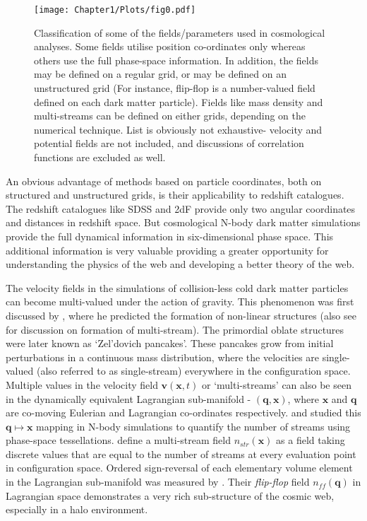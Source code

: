 \begin{figure*}
\begin{minipage}[t]{0.99\linewidth}
 \centering\texttt{[image: Chapter1/Plots/fig0.pdf]} 
\end{minipage}\hfill
{}
\caption{Classification of some of the fields/parameters used in cosmological analyses. Some fields utilise position co-ordinates only whereas others use the full phase-space information. In addition, the fields may be defined on a regular grid, or may be defined on an unstructured grid (For instance, flip-flop is a number-valued field defined on each dark matter particle). Fields like mass density and multi-streams can be defined on either grids, depending on the numerical technique. List is obviously not exhaustive- velocity and potential fields are not included, and discussions of correlation functions are excluded as well.}
\label{fig:cosmicfields}
\end{figure*}


An obvious advantage of methods based on particle coordinates, both on structured and unstructured grids, is their applicability to redshift catalogues. The redshift catalogues like SDSS and 2dF provide only two angular coordinates and distances in redshift space. But cosmological N-body dark matter simulations provide the full dynamical information in six-dimensional phase space. This additional information is very valuable providing a greater opportunity for understanding the physics of the web and developing a better theory of the web.


The velocity fields in the simulations of collision-less cold dark matter particles can become multi-valued under the action of gravity. This phenomenon was first discussed by \cite{Zeldovich1970}, where he predicted the formation of non-linear structures (also see \citealt{Shandarin1989} for discussion on formation of multi-stream). The primordial oblate structures were later known as `Zel'dovich pancakes'. These pancakes grow from initial perturbations in a continuous mass distribution, where the velocities are single-valued (also referred to as single-stream) everywhere in the configuration space. Multiple values in the velocity field $\mathbf{v} (\mathbf{x},t)$ or `multi-streams' can also be seen in the dynamically equivalent Lagrangian sub-manifold - $(\mathbf{q}, \mathbf{x})$, where $\mathbf{x}$ and $\mathbf{q}$ are co-moving Eulerian and Lagrangian co-ordinates respectively. \cite{Shandarin2011} and \cite{Abel2012b} studied this $ \mathbf{q} \mapsto \mathbf{x}$ mapping in N-body simulations to quantify the number of streams using phase-space tessellations. \cite{Shandarin2011} define a multi-stream field $n_{str}(\mathbf{x})$ as a field taking discrete values that are equal to the number of streams at every evaluation point in configuration space. Ordered sign-reversal of each elementary volume element in the Lagrangian sub-manifold was measured by \cite{Shandarin2014a}. Their {\it flip-flop} field $n_{ff}(\mathbf{q})$ in Lagrangian space demonstrates a very rich sub-structure of the cosmic web, especially in a halo environment. 

